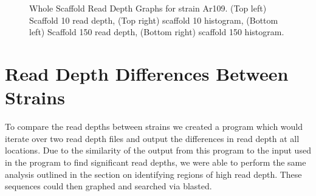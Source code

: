 \documentclass[12pt]{article}
\begin{document}
\begin{figure}[H]
	\begin{centering}
		\\
		\\
		\begin{singlespace}
			\vspace{-0.5cm}
			\caption[Whole Scaffold Read Depth Graphs.]{Whole Scaffold Read Depth Graphs for strain Ar109. (Top left) Scaffold 10 read depth, (Top right) scaffold 10 histogram, (Bottom left) Scaffold 150 read depth, (Bottom right) scaffold 150 histogram.}\label{wholescaffandhisto}
		\end{singlespace}
	\end{centering}
\end{figure}

%
%
\vspace{-0.5cm}
\section{Read Depth Differences Between Strains}
\vspace{-0.5cm}
	To compare the read depths between strains we created a program which would iterate over two read depth files and output the differences in read depth at all locations. Due to the similarity of the output from this program to the input used in the program to find significant read depths, we were able to perform the same analysis outlined in the section on identifying regions of high read depth. These sequences could then graphed and searched via blasted.
\end{document}
